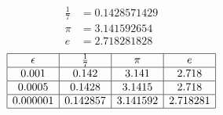 \documentclass[letterpaper,12pt,fleqn]{article}
\newcommand{\e}{\epsilon}
\begin{document}
\begin{example}
  \begin{align*}
    \frac{1}{7} &= 0.1428571429 \\
    \pi &= 3.141592654 \\
    e &= 2.718281828
  \end{align*}
  \[\begin{array}{|c|c|c|c|}
  \hline
  \e & \frac{1}{7} & \pi & e \\
  \hline
  0.001 & 0.142 & 3.141 & 2.718 \\
  \hline
  0.0005 & 0.1428 & 3.1415 & 2.718 \\
  \hline
  0.000001 & 0.142857 & 3.141592 & 2.718281 \\
  \hline
  \end{array}\]
\end{example}
\end{document}

